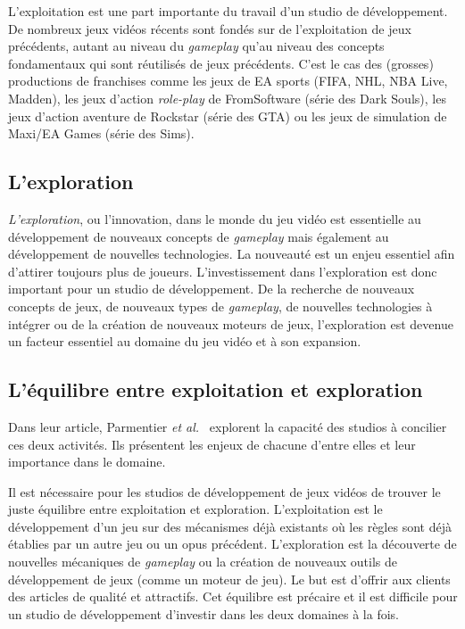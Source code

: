 L'exploitation est une part importante du travail d'un studio de développement.
De nombreux jeux vidéos récents sont fondés sur de l'exploitation de jeux précédents, autant au niveau du \emph{gameplay} qu'au niveau des concepts fondamentaux qui sont r\'eutilis\'es de jeux précédents.
C'est le cas des (grosses) productions de franchises comme les jeux de EA sports (FIFA, NHL, NBA Live, Madden), les jeux d'action \emph{role-play} de FromSoftware (série des Dark Souls), les jeux d'action aventure de Rockstar (série des GTA) ou les jeux de simulation de Maxi/EA Games (série des Sims). 

\subsection{L'exploration}
\emph{L'exploration}, ou l'innovation, dans le monde du jeu vidéo est essentielle au développement de nouveaux concepts de \emph{gameplay} mais également au développement de nouvelles technologies.
La nouveauté est un enjeu essentiel afin d'attirer toujours plus de joueurs.
L'investissement dans l'exploration est donc important pour un studio de développement.
De la recherche de nouveaux concepts de jeux, de nouveaux types de \emph{gameplay}, de nouvelles technologies à intégrer ou de la création de nouveaux moteurs de jeux, l'exploration est devenue un facteur essentiel au domaine du jeu vidéo et à son expansion.


\subsection{L'équilibre entre exploitation et exploration}
Dans leur article, Parmentier \emph{et al.}~\cite{ParmentierGuy2009Iecd} explorent la capacité des studios à concilier ces deux activités.
Ils présentent les enjeux de chacune d'entre elles et leur importance dans le domaine.

Il est nécessaire pour les studios de développement de jeux vidéos de trouver le juste équilibre entre exploitation et exploration.
L'exploitation est le développement d'un jeu sur des mécanismes déjà existants où les règles sont déjà établies par un autre jeu ou un opus précédent.
L'exploration est la découverte de nouvelles mécaniques de \emph{gameplay} ou la création de nouveaux outils de développement de jeux (comme un moteur de jeu).
Le but est d'offrir aux clients des articles de qualité et attractifs.
Cet équilibre est précaire et il est difficile pour un studio de développement d'investir dans les deux domaines à la fois. 



